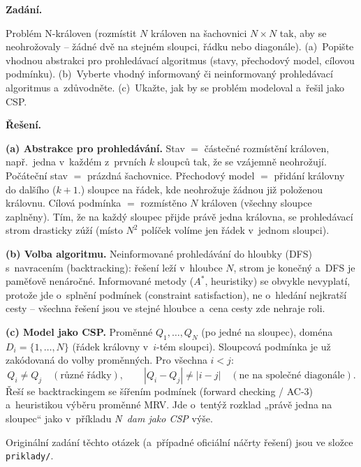 \begin{priklad}
\par
\textbf{Zadání.}\par
Problém N-královen (rozmístit $N$ královen na šachovnici $N\times N$ tak, aby se neohrožovaly -- žádné dvě na stejném sloupci, řádku nebo diagonále). (a)~Popište vhodnou abstrakci pro prohledávací algoritmus (stavy, přechodový model, cílovou podmínku). (b)~Vyberte vhodný informovaný či neinformovaný prohledávací algoritmus a~zdůvodněte. (c)~Ukažte, jak by se problém modeloval a~řešil jako CSP.

\medskip
\textbf{Řešení.}

\textbf{(a) Abstrakce pro prohledávání.} Stav $=$ částečné rozmístění královen, např.\ jedna v~každém z~prvních $k$ sloupců tak, že se vzájemně neohrožují. Počáteční stav $=$ prázdná šachovnice. Přechodový model $=$ přidání královny do dalšího ($k{+}1.$) sloupce na řádek, kde neohrožuje žádnou již položenou královnu. Cílová podmínka $=$ rozmístěno $N$ královen (všechny sloupce zaplněny). Tím, že na každý sloupec přijde právě jedna královna, se prohledávací strom drasticky zúží (místo $N^2$ políček volíme jen řádek v~jednom sloupci).

\textbf{(b) Volba algoritmu.} Neinformované prohledávání do hloubky (DFS) s~navracením (backtracking): řešení leží v~hloubce $N$, strom je konečný a~DFS je paměťově nenáročné. Informované metody ($A^*$, heuristiky) se obvykle nevyplatí, protože jde o~splnění podmínek (constraint satisfaction), ne o~hledání nejkratší cesty -- všechna řešení jsou ve stejné hloubce a~cena cesty zde nehraje roli.

\textbf{(c) Model jako CSP.} Proměnné $Q_1,\dots,Q_N$ (po jedné na sloupec), doména $D_i=\{1,\dots,N\}$ (řádek královny v~$i$-tém sloupci). Sloupcová podmínka je už zakódovaná do volby proměnných. Pro všechna $i<j$:
\[ Q_i\neq Q_j\quad(\text{různé řádky}),\qquad |Q_i-Q_j|\neq|i-j|\quad(\text{ne na společné diagonále}). \]
Řeší se backtrackingem se šířením podmínek (forward checking / AC-3) a~heuristikou výběru proměnné MRV. Jde o~tentýž rozklad „právě jedna na sloupec`` jako v~příkladu \emph{N~dam jako CSP} výše.
\end{priklad}

\noindent Originální zadání těchto otázek (a~případné oficiální náčrty řešení) jsou ve složce \texttt{priklady/}.
